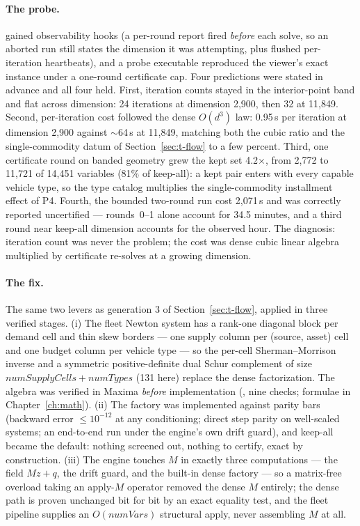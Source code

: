 \paragraph{The probe.}  gained observability hooks
(a per-round report fired \emph{before} each solve, so an aborted run
still states the dimension it was attempting, plus flushed per-iteration
heartbeats), and a probe executable reproduced the viewer's exact
instance under a one-round certificate cap. Four predictions were stated
in advance and all four held. First, iteration counts stayed in the
interior-point band and flat across dimension: 24 iterations at dimension
2{,}900, then 32 at 11{,}849. Second, per-iteration cost followed the
dense $O(d^3)$ law: 0.95\,s per iteration at dimension 2{,}900 against
$\sim$64\,s at 11{,}849, matching both the cubic ratio and the
single-commodity datum of Section~\ref{sec:t-flow} to a few percent.
Third, one certificate round on banded geometry grew the kept set
4.2$\times$, from 2{,}772 to 11{,}721 of 14{,}451 variables (81\% of
keep-all): a kept pair enters with every capable vehicle type, so the
type catalog multiplies the single-commodity installment effect of P4.
Fourth, the bounded two-round run cost 2{,}071\,s and was correctly
reported uncertified --- rounds~0--1 alone account for 34.5 minutes, and
a third round near keep-all dimension accounts for the observed hour.
The diagnosis: iteration count was never the problem; the cost was dense
cubic linear algebra multiplied by certificate re-solves at a growing
dimension.

\paragraph{The fix.} The same two levers as generation 3 of
Section~\ref{sec:t-flow}, applied in three verified stages. (i) The fleet
Newton system has a rank-one diagonal block per demand cell and thin skew
borders --- one supply column per (source, asset) cell and one budget
column per vehicle type --- so the per-cell Sherman--Morrison inverse and
a symmetric positive-definite dual Schur complement of size
$\mathit{numSupplyCells} + \mathit{numTypes}$ (131 here) replace the
dense factorization. The algebra was verified in Maxima \emph{before}
implementation (, nine checks;
formulae in Chapter~\ref{ch:math}). (ii) The factory was implemented
against parity bars (backward error $\le 10^{-12}$ at any conditioning;
direct step parity on well-scaled systems; an end-to-end run under the
engine's own  drift guard), and keep-all became the
default: nothing screened out, nothing to certify, exact by construction.
(iii) The engine touches $M$ in exactly three computations --- the field
$Mz + q$, the drift guard, and the built-in dense factory --- so a
matrix-free overload taking an apply-$M$ operator removed the dense $M$
entirely; the dense path is proven unchanged bit for bit by an exact
equality test, and the fleet pipeline supplies an $O(\mathit{numVars})$
structural apply, never assembling $M$ at all.

